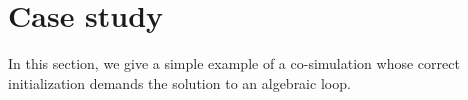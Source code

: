\section{Case study}


In this section, we give a simple example of a co-simulation whose correct initialization demands the solution to an algebraic loop.


